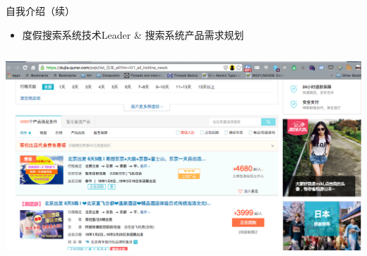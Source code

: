 \documentclass{beamer}
\begin{document}
\begin{CJK}{UTF8}{gbsn}
\begin{frame}{自我介绍（续）}
  \begin{itemize}
  \item {度假搜索系统技术Leader \& 搜索系统产品需求规划}
  \end{itemize}
  \vspace{3 mm}
  \begin{columns}
    \includegraphics[scale=0.15]{./images/pc-search-screenshot}

\end{columns}
\end{frame}
\end{CJK}
\end{document}
